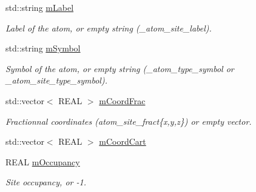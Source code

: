 \begin{DoxyCompactItemize}
\item 
\mbox{\label{struct_obj_cryst_1_1_c_i_f_data_1_1_c_i_f_atom_a32f3b29fdecc1ea4ed42fd2f588f7dc2}} 
std\+::string \mbox{\hyperlink{struct_obj_cryst_1_1_c_i_f_data_1_1_c_i_f_atom_a32f3b29fdecc1ea4ed42fd2f588f7dc2}{m\+Label}}
\begin{DoxyCompactList}\small\item\em Label of the atom, or empty string (\+\_\+atom\+\_\+site\+\_\+label). \end{DoxyCompactList}\item 
\mbox{\label{struct_obj_cryst_1_1_c_i_f_data_1_1_c_i_f_atom_a70e19874d95cb054f2e6b4da29716708}} 
std\+::string \mbox{\hyperlink{struct_obj_cryst_1_1_c_i_f_data_1_1_c_i_f_atom_a70e19874d95cb054f2e6b4da29716708}{m\+Symbol}}
\begin{DoxyCompactList}\small\item\em Symbol of the atom, or empty string (\+\_\+atom\+\_\+type\+\_\+symbol or \+\_\+atom\+\_\+site\+\_\+type\+\_\+symbol). \end{DoxyCompactList}\item 
\mbox{\label{struct_obj_cryst_1_1_c_i_f_data_1_1_c_i_f_atom_a944637d7d2dba56c50205e1d4c513d19}} 
std\+::vector$<$ R\+E\+AL $>$ \mbox{\hyperlink{struct_obj_cryst_1_1_c_i_f_data_1_1_c_i_f_atom_a944637d7d2dba56c50205e1d4c513d19}{m\+Coord\+Frac}}
\begin{DoxyCompactList}\small\item\em Fractionnal coordinates ({\itshape atom\+\_\+site\+\_\+fract}\{x,y,z\}) or empty vector. \end{DoxyCompactList}\item 
std\+::vector$<$ R\+E\+AL $>$ \mbox{\hyperlink{struct_obj_cryst_1_1_c_i_f_data_1_1_c_i_f_atom_a41f73d2cfecece32b4e2b60bc6bbff11}{m\+Coord\+Cart}}
\item 
\mbox{\label{struct_obj_cryst_1_1_c_i_f_data_1_1_c_i_f_atom_a16f0861b67d0ba12c3ecaafa438e7c8f}} 
R\+E\+AL \mbox{\hyperlink{struct_obj_cryst_1_1_c_i_f_data_1_1_c_i_f_atom_a16f0861b67d0ba12c3ecaafa438e7c8f}{m\+Occupancy}}
\begin{DoxyCompactList}\small\item\em Site occupancy, or -\/1. \end{DoxyCompactList}\item 

\end{DoxyCompactItemize}
